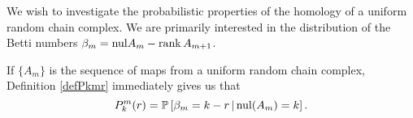 

We wish to investigate the probabilistic properties of the homology of a uniform random
chain complex.  We are primarily interested in the distribution of the Betti
numbers $\beta_m = \mathrm{nul} A_m - \operatorname{\mathrm{rank}} A_{m+1}$.

\begin{remark}
If $\{A_m\}$ is the sequence of maps from a uniform random chain complex, Definition
\ref{defPkmr} immediately gives us that
\[
  P^m_k(r) = \mathbb{P}\left[\beta_m = k-r \,|\, \mathrm{nul}(A_{m}) = k\right].
\]
\end{remark}






